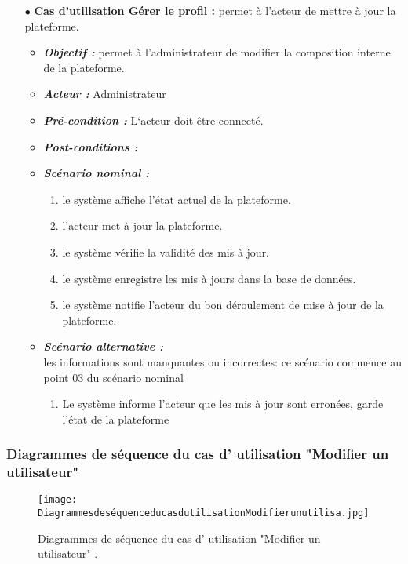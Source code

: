 \begin{itemize}
      \item[$\bullet$] \textbf{Cas d’utilisation Gérer le profil :} permet à l’acteur de mettre à jour la plateforme. 
	\medskip
	\begin{itemize}
		\item \textit{\textbf{Objectif :}}  permet à l’administrateur de modifier la composition interne de la plateforme. 
		
		\item \textit{\textbf{Acteur :}} Administrateur
		
		\item \textit{\textbf{Pré-condition  :}}  L‘acteur doit être connecté.
		\item \textit{\textbf{Post-conditions   :}}
		\item \textit{\textbf{Scénario nominal :}}
		\begin{enumerate}
			\item le système affiche l’état actuel de la plateforme. 
			\item l’acteur met à jour la plateforme. 
			\item   le système vérifie la validité des mis à jour.  
			\item  le système enregistre les mis à jours dans la base de données.  
			\item le système notifie l’acteur du bon déroulement de mise à jour de la plateforme.
		\end{enumerate}
		\item \textit{\textbf{Scénario alternative :}} \\
les informations sont manquantes ou incorrectes: ce scénario commence au point 03 du
scénario nominal
		\begin{enumerate}
			\item  Le système informe l’acteur que les mis à jour sont erronées, garde l’état de la plateforme 
		\end{enumerate}
	\end{itemize}
\end{itemize}
\clearpage	
\subsubsection{Diagrammes de séquence du cas d' utilisation "Modifier un utilisateur" }
\begin{figure}[ht]
	\centering
	\texttt{[image: DiagrammesdeséquenceducasdutilisationModifierunutilisa.jpg]}
	\caption{Diagrammes de séquence du cas d' utilisation "Modifier un utilisateur"  .}
	\label{fig:Diagrammes de séquence du cas d' utilisation Modifier un utilisateur }
\end{figure}
\FloatBarrier


